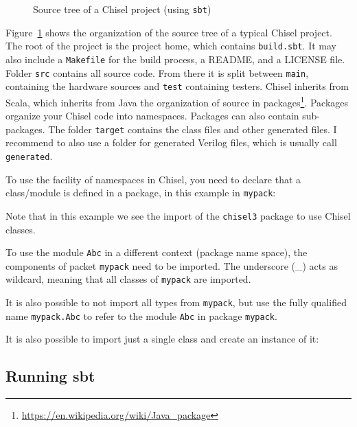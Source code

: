 \documentclass[%
    10pt,
    headinclude, footexclude,
    openright, %
    notitlepage,
    cleardoubleempty,
    headsepline,
    pointlessnumbers,
    bibtotoc, idxtotoc,
    ]{scrbook}
\newcommand{\code}[1]{{\small{\texttt{#1}}}}
\newcommand{\myref}[2]{\href{#1}{#2}}
\renewcommand{\myref}[2]{{#2}{\footnote{\url{#1}}}}
\begin{document}
\begin{figure}
\caption{Source tree of a Chisel project (using \code{sbt})}
\label{fig:folders}
\end{figure}

Figure~\ref{fig:folders} shows the organization of the source tree of a typical Chisel project.
The root of the project is the project home, which contains \code{build.sbt}.
It may also include a \code{Makefile} for the build process, a README, and a LICENSE file.
Folder \code{src} contains all source code. From there it is split between \code{main},
containing the hardware sources and \code{test} containing testers.
Chisel inherits from Scala, which inherits from Java the organization of source
in \myref{https://en.wikipedia.org/wiki/Java_package}{packages}.
Packages organize your Chisel code into namespaces. Packages can also contain
sub-packages.
The folder \code{target} contains the class files and other generated files.
I recommend to also use a folder for generated Verilog files, which is usually
call \code{generated}.


To use the facility of namespaces in Chisel, you need to declare that a class/module
is defined in a package, in this example in \code{mypack}:


\noindent Note that in this example we see the import of the \code{chisel3} package
to use Chisel classes.

To use the module \code{Abc} in a different context (package name space),
the components of packet \code{mypack} need to be imported. The underscore
(\_) acts as wildcard, meaning that all classes of \code{mypack} are imported.


\noindent It is also possible to not import all types from \code{mypack},
but use the fully qualified name \code{mypack.Abc} to refer to the module
\code{Abc} in package \code{mypack}.


\noindent It is also possible to import just a single class and create an instance of it:



\subsection{Running sbt}
\end{document}
